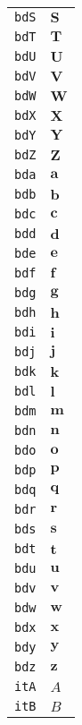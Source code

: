 \begin{longtable}{ll}
\texttt{bdS}&${}{\textbf{S}}{}$\\
\texttt{bdT}&${}{\textbf{T}}{}$\\
\texttt{bdU}&${}{\textbf{U}}{}$\\
\texttt{bdV}&${}{\textbf{V}}{}$\\
\texttt{bdW}&${}{\textbf{W}}{}$\\
\texttt{bdX}&${}{\textbf{X}}{}$\\
\texttt{bdY}&${}{\textbf{Y}}{}$\\
\texttt{bdZ}&${}{\textbf{Z}}{}$\\
\texttt{bda}&${}{\textbf{a}}{}$\\
\texttt{bdb}&${}{\textbf{b}}{}$\\
\texttt{bdc}&${}{\textbf{c}}{}$\\
\texttt{bdd}&${}{\textbf{d}}{}$\\
\texttt{bde}&${}{\textbf{e}}{}$\\
\texttt{bdf}&${}{\textbf{f}}{}$\\
\texttt{bdg}&${}{\textbf{g}}{}$\\
\texttt{bdh}&${}{\textbf{h}}{}$\\
\texttt{bdi}&${}{\textbf{i}}{}$\\
\texttt{bdj}&${}{\textbf{j}}{}$\\
\texttt{bdk}&${}{\textbf{k}}{}$\\
\texttt{bdl}&${}{\textbf{l}}{}$\\
\texttt{bdm}&${}{\textbf{m}}{}$\\
\texttt{bdn}&${}{\textbf{n}}{}$\\
\texttt{bdo}&${}{\textbf{o}}{}$\\
\texttt{bdp}&${}{\textbf{p}}{}$\\
\texttt{bdq}&${}{\textbf{q}}{}$\\
\texttt{bdr}&${}{\textbf{r}}{}$\\
\texttt{bds}&${}{\textbf{s}}{}$\\
\texttt{bdt}&${}{\textbf{t}}{}$\\
\texttt{bdu}&${}{\textbf{u}}{}$\\
\texttt{bdv}&${}{\textbf{v}}{}$\\
\texttt{bdw}&${}{\textbf{w}}{}$\\
\texttt{bdx}&${}{\textbf{x}}{}$\\
\texttt{bdy}&${}{\textbf{y}}{}$\\
\texttt{bdz}&${}{\textbf{z}}{}$\\
\texttt{itA}&${}{\textit{A}}{}$\\
\texttt{itB}&${}{\textit{B}}{}$\\

\end{longtable}
